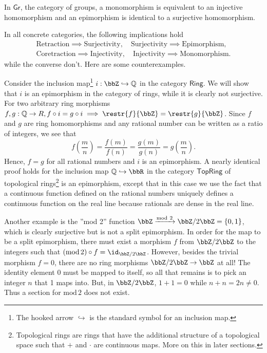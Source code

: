 %
\begin{prop}
In $\mathsf{Gr}$, the category of groups, a monomorphism is equivalent
to an injective homomorphism and an epimorphism is identical to a
surjective homomorphism.
\end{prop}
In all concrete categories, the following implications hold 
\begin{gather}
\text{Retraction}\implies\text{Surjectivity},\quad\text{Surjectivity}\implies\text{Epimorphism},\\
\text{Coretraction}\implies\text{Injectivity},\quad\text{Injectivity}\implies\text{Monomorphism.}
\end{gather}
while the converse don't. Here are some counterexamples. 
\begin{example}
Consider the inclusion map\footnote{The hooked arrow $\hookrightarrow$ is the standard symbol for an
inclusion map.} $i:\bbZ\hookrightarrow\mathbb{Q}$ in the category $\mathsf{Ring}$.
We will show that $i$ is an epimorphism in the category of rings,
while it is clearly not surjective. For two arbitrary ring morphisms
$f,g:\mathbb{Q}\rightarrow R,f\circ i=g\circ i\implies\restr{f}{\bbZ}=\restr{g}{\bbZ}$.
Since $f$ and $g$ are ring homomorphisms and any rational number
can be written as a ratio of integers, we see that 
\begin{equation}
f\left(\frac{m}{n}\right)=\frac{f(m)}{f(n)}=\frac{g(m)}{g(n)}=g\left(\frac{m}{n}\right).
\end{equation}
Hence, $f=g$ for all rational numbers and $i$ is an epimorphism.
A nearly identical proof holds for the inclusion map $\mathbb{Q}\hookrightarrow\bbR $
in the category $\mathsf{TopRing}$ of topological rings\footnote{Topological rings are rings that have the additional structure of
a topological space such that $+$ and $\cdot$ are continuous maps.
More on this in later sections.} is an epimorphism, except that in this case we use the fact that
a continuous function defined on the rational numbers uniquely defines
a continuous function on the real line because rationals are dense
in the real line.
\end{example}
%
\begin{example}
Another example is the ''mod 2'' function $\bbZ\xrightarrow{\text{mod}~2}\bbZ/2\bbZ=\{0,1\}$,
which is clearly surjective but is not a split epimorphism. In order
for the map to be a split epimorphism, there must exist a morphism
$f$ from $\bbZ/2\bbZ$ to the integers such that $\left(\text{mod}\,2\right)\circ f=\id_{\bbZ/2\bbZ}$.
However, besides the trivial morphism $f=0$, there are no ring morphisms
$\bbZ/2\bbZ\to\bbZ$ at all! The identity element
0 must be mapped to itself, so all that remains is to pick an integer
$n$ that 1 maps into. But, in $\bbZ/2\bbZ$, $1+1=0$
while $n+n=2n\ne0$. Thus a section for $\text{mod}\,2$ does not exist.
\end{example}
